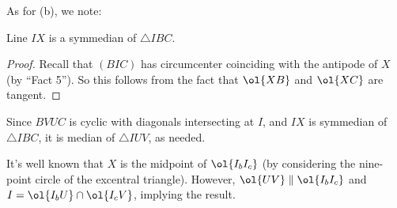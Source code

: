 \documentclass[11pt]{scrartcl}
\begin{document}
As for (b), we note:
\begin{claim*}
  Line $IX$ is a symmedian of $\triangle IBC$.
\end{claim*}
\begin{proof}
  Recall that $(BIC)$ has circumcenter
  coinciding with the antipode of $X$ (by ``Fact 5'').
  So this follows from the fact
  that $\ol{XB}$ and $\ol{XC}$ are tangent.
\end{proof}
Since $BVUC$ is cyclic with diagonals intersecting at $I$,
and $IX$ is symmedian of $\triangle IBC$,
it is median of $\triangle IUV$, as needed.

\begin{remark*}
  It's well known that $X$ is the midpoint of $\ol{I_b I_c}$
  (by considering the nine-point circle of the excentral triangle).
  However, $\ol{UV} \parallel \ol{I_b I_c}$
  and $I = \ol{I_b U} \cap \ol{I_c V}$, implying the result.
\end{remark*}
\pagebreak
\end{document}
